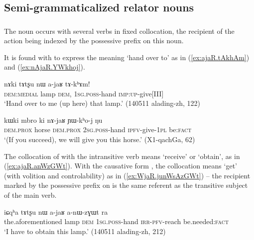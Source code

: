 \subsection{Semi-grammaticalized relator nouns} \label{sec:semi.grammaticalized.relator}

\subsubsection{} \label{sec:tWjaR}
The noun  occurs with several verbs in fixed collocation, the recipient of the action being indexed by the possessive prefix on this noun.

It is found with  to express the meaning `hand over to' as in (\ref{ex:ajaR.tAkhAm}) and (\ref{ex:nAjaR.YWkhoj}).

\begin{exe}
\ex \label{ex:ajaR.tAkhAm}
\gll nɤki tɤtʂu nɯ a-jaʁ tɤ-kʰɤm! \\
\textsc{dem}:\textsc{medial} lamp \textsc{dem}, \textsc{1sg}.\textsc{poss}-hand \textsc{imp}:\textsc{up}-give[III] \\
\glt `Hand over to me (up here) that lamp.' (140511 alading-zh, 122)
\end{exe}

\begin{exe}
\ex \label{ex:nAjaR.YWkhoj}
\gll kɯki mbro ki nɤ-jaʁ ɲɯ-kʰo-j ŋu \\
\textsc{dem}.\textsc{prox} horse \textsc{dem}.\textsc{prox} \textsc{2sg}.\textsc{poss}-hand \textsc{ipfv}-give-\textsc{1pl} be:\textsc{fact} \\
\glt  `(If you succeed), we will give you this horse.'  (X1-qachGa, 62)
\end{exe}

The collocation of  with the intransitive verb  means `receive' or `obtain', as in (\ref{ex:ajaR.anWzGWt}). With the causative form , the collocation means `get' (with volition and controlability) as in (\ref{ex:WjaR.junWsAzGWt}) -- the recipient marked by the possessive prefix on   is the same referent as the transitive subject of the main verb.

\begin{exe}
\ex \label{ex:ajaR.anWzGWt}
\gll iɕqʰa tɤtʂu nɯ a-jaʁ a-nɯ-zɣɯt ra \\
the.aforementioned lamp \textsc{dem} \textsc{1sg}.\textsc{poss}-hand \textsc{irr}-\textsc{pfv}-reach be.needed:\textsc{fact} \\
\glt   `I have to obtain this lamp.' (140511 alading-zh, 212)
\end{exe}

